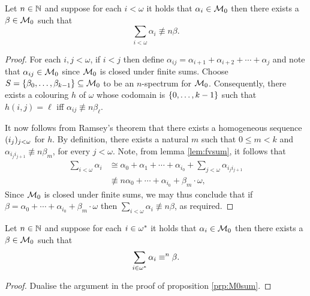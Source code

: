 \begin{prp}\label{prp:M0sum}
	Let $n\in\mathbb{N}$ and suppose for each $i<\omega$ it holds that $\alpha_i\in\mathcal{M}_0$ then there exists a $\beta\in\mathcal{M}_0$ such that
	\begin{equation}
		\sum_{i<\omega}\alpha_i\nequiv{n}\beta.
	\end{equation}
\end{prp}
\begin{proof}
	For each $i,j<\omega$, if $i<j$ then define $\alpha_{ij}=\alpha_{i+1}+\alpha_{i+2}+\dotsb+\alpha_j$ and note that $\alpha_{ij}\in\mathcal{M}_0$ since $\mathcal{M}_0$ is closed under finite sums.  Choose $S=\left\lbrace \beta_0,\dotsc,\beta_{k-1}\right\rbrace\subseteq\mathcal{M}_0$ to be an $n$-spectrum for $\mathcal{M}_0$.  Consequently, there exists a colouring $h$ of $\omega$ whose codomain is $\left\lbrace 0,\dotsc,k-1\right\rbrace$ such that $h(i,j)=\ell$ iff $\alpha_{ij}\nequiv{n}\beta_\ell$.

	It now follows from Ramsey's theorem that there exists a homogeneous sequence $(i_j)_{j<\omega}$ for $h$.  By definition, there exists a natural $m$ such that $0\leq m<k$ and $\alpha_{i_ji_{j+1}}\nequiv{n}\beta_m$, for every $j<\omega$.  Note, from lemma \ref{lem:fvsum}, it follows that
	\begin{align}
		\sum_{i<\omega}\alpha_i&\cong\alpha_0+\alpha_1+\dotsb+\alpha_{i_0}+\sum_{j<\omega}\alpha_{i_ji_{j+1}}\\
		&\nequiv{n}\alpha_0+\dotsb+\alpha_{i_0}+\beta_m\cdot\omega,
	\end{align}
	Since $\mathcal{M}_0$ is closed under finite sums, we may thus conclude that if $\beta=\alpha_0+\dotsb+\alpha_{i_0}+\beta_m\cdot\omega$ then $\sum_{i<\omega}\alpha_i\nequiv{n}\beta$, as required.
\end{proof}

\begin{prp}\label{prp:M0sumop}
	Let $n\in\mathbb{N}$ and suppose for each $i\in{\omega}^\ast$ it holds that $\alpha_i\in\mathcal{M}_0$ then there exists a $\beta\in\mathcal{M}_0$ such that
	\begin{equation}
		\sum_{i\in{\omega}^\ast}\alpha_i\equiv^{n}\beta.
	\end{equation}
\end{prp}
\begin{proof}
	Dualise the argument in the proof of proposition \ref{prp:M0sum}.
\end{proof}

